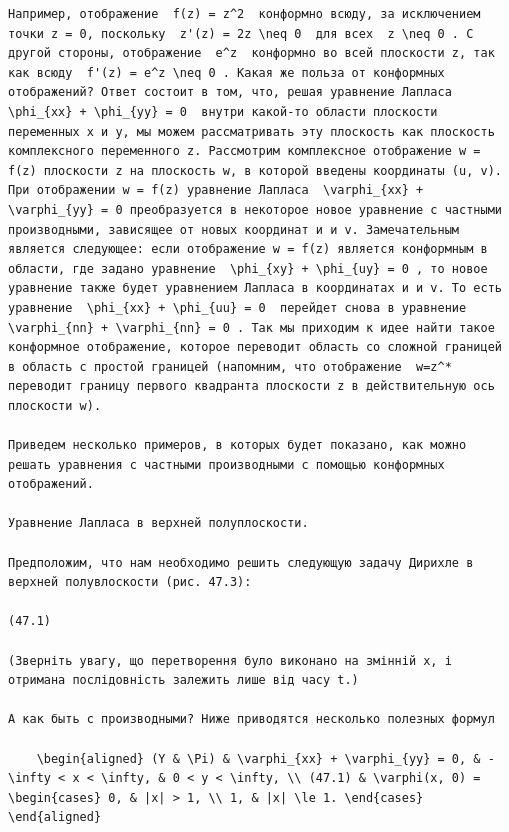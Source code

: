\documentclass[
  ukrainian,
]{article}
\begin{document}
\begin{verbatim}
Например, отображение  f(z) = z^2  конформно всюду, за исключением точки z = 0, поскольку  z'(z) = 2z \neq 0  для всех  z \neq 0 . C другой стороны, отображение  e^z  конформно во всей плоскости z, так как всюду  f'(z) = e^z \neq 0 . Какая же польза от конформных отображений? Ответ состоит в том, что, решая уравнение Лапласа  \phi_{xx} + \phi_{yy} = 0  внутри какой-то области плоскости переменных x и y, мы можем рассматривать эту плоскость как плоскость комплексного переменного z. Рассмотрим комплексное отображение w = f(z) плоскости z на плоскость w, в которой введены координаты (u, v). При отображении w = f(z) уравнение Лапласа  \varphi_{xx} + \varphi_{yy} = 0 преобразуется в некоторое новое уравнение с частными производными, зависящее от новых координат и и v. Замечательным является следующее: если отображение w = f(z) является конформным в области, где задано уравнение  \phi_{xy} + \phi_{uy} = 0 , то новое уравнение также будет уравнением Лапласа в координатах и и v. To есть уравнение  \phi_{xx} + \phi_{uu} = 0  перейдет снова в уравнение  \varphi_{nn} + \varphi_{nn} = 0 . Так мы приходим к идее найти такое конформное отображение, которое переводит область со сложной границей в область с простой границей (напомним, что отображение  w=z^*  переводит границу первого квадранта плоскости z в действительную ось плоскости w).

Приведем несколько примеров, в которых будет показано, как можно решать уравнения с частными производными с помощью конформных отображений.

Уравнение Лапласа в верхней полуплоскости.

Предположим, что нам необходимо решить следующую задачу Дирихле в верхней полувлоскости (рис. 47.3):

(47.1) 

(Зверніть увагу, що перетворення було виконано на змінній x, і отримана послідовність залежить лише від часу t.)

А как быть с производными? Ниже приводятся несколько полезных формул

    \begin{aligned} (Y & \Pi) & \varphi_{xx} + \varphi_{yy} = 0, & -\infty < x < \infty, & 0 < y < \infty, \\ (47.1) & \varphi(x, 0) = \begin{cases} 0, & |x| > 1, \\ 1, & |x| \le 1. \end{cases} \end{aligned}
\end{verbatim}
\end{document}
